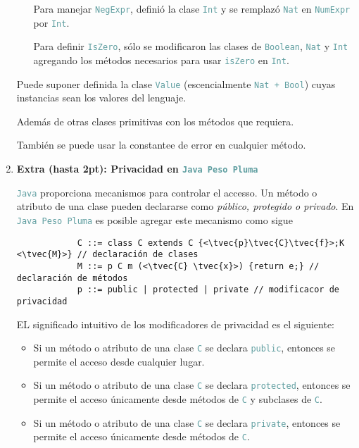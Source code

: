 \documentclass{article}
\newcommand{\tx}[1]{\textcolor{CadetBlue} {\texttt{#1}}}
\newcommand{\tb}[1]{\textcolor{RoyalPurple} {\textbf{#1}}}
\newcommand{\ti}[1]{\textcolor{RoyalPurple} {\textit{#1}}}
\newcommand{\pt}[1]{\textcolor{RoyalPurple}{(#1pt)}}
\newcommand{\tvec}[1]{$\vec{\tx{#1}}$ }
\begin{document}
\begin{enumerate}
\begin{enumerate}
            Para manejar \tx{NegExpr}, definió la clase \tx{Int} y se remplazó
            \tx{Nat} en \tx{NumExpr} por \tx{Int}.

            Para definir \tx{IsZero}, sólo se modificaron las clases de 
            \tx{Boolean}, \tx{Nat} y \tx{Int} agregando los métodos necesarios
            para usar \tx{isZero} en \tx{Int}.
        \end{enumerate}

        Puede suponer definida la clase \tx{Value} (escencialmente 
        \tx{Nat + Bool}) cuyas instancias sean los valores del lenguaje.

        Además de otras clases primitivas con los métodos que requiera.

        También se puede usar la constantee de error en cualquier método.

        \item \tb{Extra \pt{hasta 2}: Privacidad en \tx{Java Peso Pluma}}

        \tx{Java} proporciona mecanismos para controlar el accesso. Un método o
        atributo de una clase pueden declararse como \ti{público, protegido o 
        privado}. En \tx{Java Peso Pluma} es posible agregar este mecanismo como
        sigue

        \begin{verbatim}
            C ::= class C extends C {<\tvec{p}\tvec{C}\tvec{f}>;K <\tvec{M}>} // declaración de clases
            M ::= p C m (<\tvec{C} \tvec{x}>) {return e;} // declaración de métodos
            p ::= public | protected | private // modificacor de privacidad
        \end{verbatim}

        EL significado intuitivo de los modificadores de privacidad es el 
        siguiente:

        \begin{itemize}
            \item Si un método o atributo de una clase \tx{C} se declara 
            \tx{public}, entonces se permite el acceso desde cualquier lugar.

            \item Si un método o atributo de una clase \tx{C} se declara 
            \tx{protected}, entonces se permite el acceso únicamente desde
            métodos de \tx{C} y subclases de \tx{C}.

            \item Si un método o atributo de una clase \tx{C} se declara 
            \tx{private}, entonces se permite el acceso únicamente desde
            métodos de \tx{C}.
        \end{itemize}


\end{enumerate}
\end{document}
